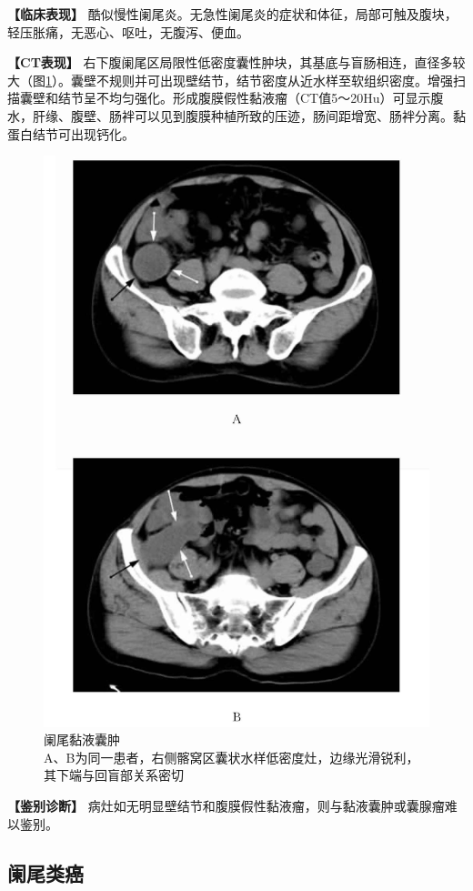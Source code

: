 \textbf{【临床表现】}
酷似慢性阑尾炎。无急性阑尾炎的症状和体征，局部可触及腹块，轻压胀痛，无恶心、呕吐，无腹泻、便血。

\textbf{【CT表现】}
右下腹阑尾区局限性低密度囊性肿块，其基底与盲肠相连，直径多较大（图\ref{fig17-15}）。囊壁不规则并可出现壁结节，结节密度从近水样至软组织密度。增强扫描囊壁和结节呈不均匀强化。形成腹膜假性黏液瘤（CT值5～20Hu）可显示腹水，肝缘、腹壁、肠袢可以见到腹膜种植所致的压迹，肠间距增宽、肠袢分离。黏蛋白结节可出现钙化。

\begin{figure}[!htbp]
 \centering
 \includegraphics[width=.7\textwidth,height=\textheight,keepaspectratio]{./images/Image00367.jpg}
 \captionsetup{justification=centering}
 \caption{阑尾黏液囊肿\\{\small A、B为同一患者，右侧髂窝区囊状水样低密度灶，边缘光滑锐利，其下端与回盲部关系密切}}
 \label{fig17-15}
  \end{figure} 

\textbf{【鉴别诊断】}
病灶如无明显壁结节和腹膜假性黏液瘤，则与黏液囊肿或囊腺瘤难以鉴别。

\subsection{阑尾类癌}

